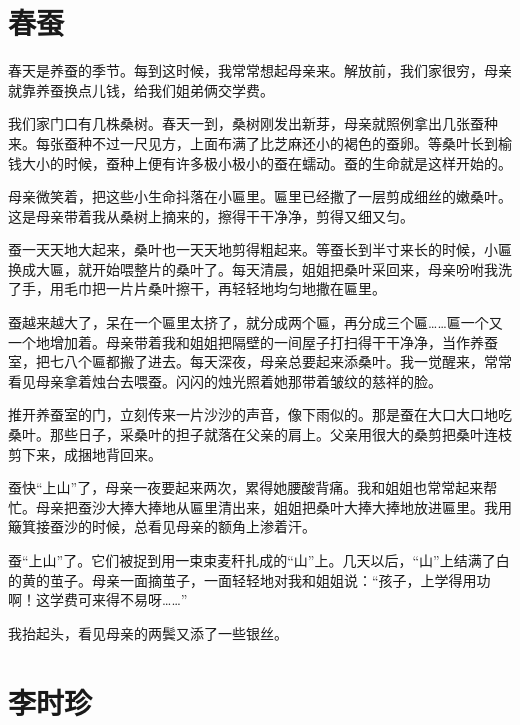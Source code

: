\documentclass[12pt,UTF-8,openany]{ctexbook}
\begin{document}
\chapter{春蚕}

\begin{Large}
    
    春天是养蚕的季节。每到这时候，我常常想起母亲来。解放前，我们家很穷，母亲就靠养蚕换点儿钱，给我们姐弟俩交学费。
    
    我们家门口有几株桑树。春天一到，桑树刚发出新芽，母亲就照例拿出几张蚕种来。每张蚕种不过一尺见方，上面布满了比芝麻还小的褐色的蚕卵。等桑叶长到榆钱大小的时候，蚕种上便有许多极小极小的蚕在蠕动。蚕的生命就是这样开始的。
    
    母亲微笑着，把这些小生命抖落在小匾里。匾里已经撒了一层剪成细丝的嫩桑叶。这是母亲带着我从桑树上摘来的，擦得干干净净，剪得又细又匀。
    
    蚕一天天地大起来，桑叶也一天天地剪得粗起来。等蚕长到半寸来长的时候，小匾换成大匾，就开始喂整片的桑叶了。每天清晨，姐姐把桑叶采回来，母亲吩咐我洗了手，用毛巾把一片片桑叶擦干，再轻轻地均匀地撒在匾里。
    
    蚕越来越大了，呆在一个匾里太挤了，就分成两个匾，再分成三个匾……匾一个又一个地增加着。母亲带着我和姐姐把隔壁的一间屋子打扫得干干净净，当作养蚕室，把七八个匾都搬了进去。每天深夜，母亲总要起来添桑叶。我一觉醒来，常常看见母亲拿着烛台去喂蚕。闪闪的烛光照着她那带着皱纹的慈祥的脸。
    
    推开养蚕室的门，立刻传来一片沙沙的声音，像下雨似的。那是蚕在大口大口地吃桑叶。那些日子，采桑叶的担子就落在父亲的肩上。父亲用很大的桑剪把桑叶连枝剪下来，成捆地背回来。
    
    蚕快“上山”了，母亲一夜要起来两次，累得她腰酸背痛。我和姐姐也常常起来帮忙。母亲把蚕沙大捧大捧地从匾里清出来，姐姐把桑叶大捧大捧地放进匾里。我用簸箕接蚕沙的时候，总看见母亲的额角上渗着汗。
    
    蚕“上山”了。它们被捉到用一束束麦秆扎成的“山”上。几天以后，“山”上结满了白的黄的茧子。母亲一面摘茧子，一面轻轻地对我和姐姐说：“孩子，上学得用功啊！这学费可来得不易呀……”
    
    我抬起头，看见母亲的两鬓又添了一些银丝。
    
\end{Large}

\chapter{李时珍}
\end{document}
